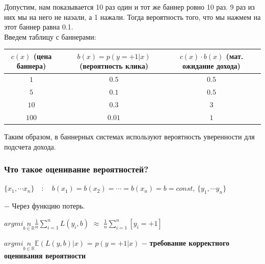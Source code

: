         Допустим, нам показывается 10 раз один и тот же баннер ровно 10 раз. 9 раз из них мы на него не наэали, а 1 нажали. Тогда вероятность того, что мы нажмем на этот баннер равна 0.1.\\

        Введем таблицу с баннерами:\\
        \begin{table}[ht]
            \centering
            \begin{tabular}{|c|c|c|c|}
            \hline
            $c(x)$ (цена баннера) & $b(x) = p(y=+1 | x)$ (вероятность клика)& $c(x)\cdot b(x)$ (мат. ожидание дохода)\\
            \hline
            $1$ & $0.5$ & $0.5$\\
            \hline
            $5$ & $0.1$ & $0.5$\\
            \hline
            $10$ & $0.3$ & $3$\\ 
            \hline
            $100$ & $0.01$ & $1$\\
            \hline
            
            \hline
            \end{tabular}
        \end{table}
        
        Таким образом, в баннерных системах используют вероятность уверенности для подсчета дохода.

        \subsubsection{Что такое оценивание вероятностей?}

        \begin{center}
            $\{x_1, \cdots x_n\} \quad : \quad b(x_1) = b(x_2) = \cdots = b(x_n) = b = const$, \quad\quad\quad $\{y_1, \cdots y_n\}$
        \end{center}
        
         $-$ Через функцию потерь.

        \begin{center}
            \large{$argmin\limits_{b \in \mathbb{R}}\frac{1}{n}\sum\limits_{i = 1}^nL(y_i, b)$ $\approx$ $\frac{1}{n}\sum\limits_{i = 1}^n[y_i = +1]$}
        \end{center}

        \begin{center}
            \large{$argmin\limits_{b \in \mathbb{R}} \mathbb{E}(L(y, b) | x)$ = $p(y = +1 | x)$ $-$ \textbf{требование корректного оценивания вероятности}}
        \end{center}

